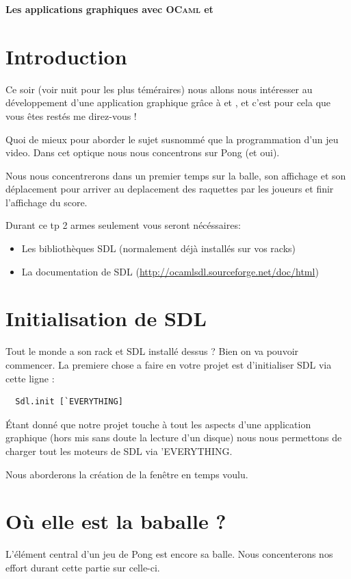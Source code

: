 \documentclass[a4paper]{article}
\begin{document}
\begin{center}
  {\Large {\bf Les applications graphiques avec 
  \textsc{OCaml} et }}
\end{center}

\bigskip

\section*{Introduction}

Ce soir (voir nuit pour les plus téméraires) nous allons nous intéresser au développement d'une application graphique grâce à  et , et c'est pour cela que vous êtes restés me direz-vous !\par
Quoi de mieux pour aborder le sujet susnommé que la programmation d'un jeu video. Dans cet optique nous nous concentrons sur Pong (et oui).\par 
Nous nous concentrerons dans un premier temps sur la balle, son affichage et son déplacement pour arriver au deplacement des raquettes par les joueurs et finir l'affichage du score.

Durant ce tp 2 armes seulement vous seront nécéssaires:
\begin{itemize}
\item Les bibliothèques SDL (normalement déjà installés sur vos racks)
\item La documentation de SDL (\url{http://ocamlsdl.sourceforge.net/doc/html})
\end{itemize}

\section{Initialisation de SDL}
Tout le monde a son rack et SDL installé dessus ? Bien on va pouvoir commencer.
La premiere chose a faire en votre projet est d'initialiser SDL via cette ligne :

\begin{lstlisting}
  Sdl.init [`EVERYTHING]
\end{lstlisting}

Étant donné que notre projet touche à tout les aspects d'une application graphique (hors mis sans doute la lecture d'un disque) nous nous permettons de charger tout les moteurs de SDL via 'EVERYTHING.\par
Nous aborderons la création de la fenêtre en temps voulu.

\section{Où elle est la baballe ?}
L'élément central d'un jeu de Pong est encore sa balle. Nous concenterons nos effort durant cette partie sur celle-ci.\par\bigskip
\end{document}
